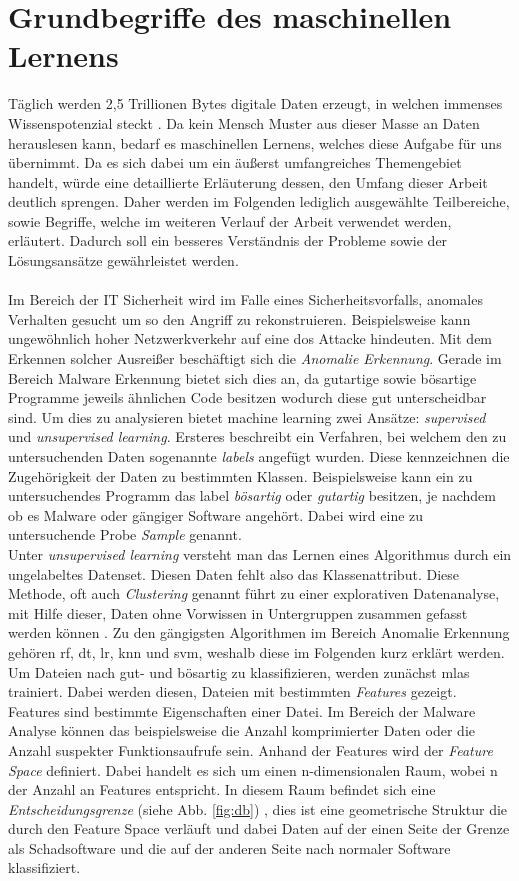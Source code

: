 \documentclass[
    12pt, %
    DIV10,
    ngerman, %
    a4paper, %
    oneside, %
    titlepage, %
    parskip=half, %
    headings=normal, %
    listof=totoc, %
    bibliography=totoc, %
    index=totoc, %
    captions=tableheading, %
    final %
]{scrreprt}
\begin{document}
\section{Grundbegriffe des maschinellen Lernens}
Täglich werden 2,5 Trillionen Bytes digitale Daten erzeugt, in welchen immenses Wissenspotenzial steckt \parencite{MerlinOne}. Da kein Mensch Muster aus dieser Masse an Daten herauslesen kann, bedarf es maschinellen Lernens, welches diese Aufgabe für uns übernimmt. Da es sich dabei um ein äu{\ss}erst umfangreiches Themengebiet handelt, würde eine detaillierte Erläuterung dessen, den Umfang dieser Arbeit deutlich sprengen. Daher werden im Folgenden lediglich ausgewählte Teilbereiche, sowie Begriffe, welche im weiteren Verlauf der Arbeit verwendet werden, erläutert. Dadurch soll ein besseres Verständnis der Probleme sowie der Lösungsansätze gewährleistet werden.\\\\
Im Bereich der IT Sicherheit wird im Falle eines Sicherheitsvorfalls, anomales Verhalten gesucht um so den Angriff zu rekonstruieren. Beispielsweise kann ungewöhnlich hoher Netzwerkverkehr auf eine \ac{dos} Attacke hindeuten. Mit dem Erkennen solcher Ausrei{\ss}er beschäftigt sich die \emph{Anomalie Erkennung}. Gerade im Bereich Malware Erkennung bietet sich dies an, da gutartige sowie bösartige Programme jeweils ähnlichen Code besitzen wodurch diese gut unterscheidbar sind. Um dies zu analysieren bietet machine learning zwei Ansätze: \emph{supervised} und \emph{unsupervised learning}. Ersteres beschreibt ein Verfahren, bei welchem den zu untersuchenden Daten sogenannte \emph{labels} angefügt wurden. Diese kennzeichnen die Zugehörigkeit der Daten zu bestimmten Klassen. Beispielsweise kann ein zu untersuchendes Programm das label \emph{bösartig} oder \emph{gutartig} besitzen, je nachdem ob es Malware oder gängiger Software angehört. Dabei wird eine zu untersuchende Probe \emph{Sample} genannt.\\
Unter \emph{unsupervised learning} versteht man das Lernen eines Algorithmus durch ein ungelabeltes Datenset. Diesen Daten fehlt also das Klassenattribut. Diese Methode, oft auch \emph{Clustering} genannt führt zu einer explorativen Datenanalyse, mit Hilfe dieser, Daten ohne Vorwissen in Untergruppen zusammen gefasst werden können \parencite{raschka2017python}.
Zu den gängigsten Algorithmen im Bereich Anomalie Erkennung gehören \ac{rf}, \ac{dt}, \ac{lr}, \ac{knn} und \ac{svm}, weshalb diese im Folgenden kurz erklärt werden.\\
Um Dateien nach gut- und bösartig zu klassifizieren, werden zunächst \ac{mlas} trainiert. Dabei werden diesen, Dateien mit bestimmten \emph{Features} gezeigt. Features sind bestimmte Eigenschaften einer Datei. Im Bereich der Malware Analyse können das beispielsweise die Anzahl komprimierter Daten oder die Anzahl suspekter Funktionsaufrufe sein. Anhand der Features wird der \emph{Feature Space} definiert. Dabei handelt es sich um einen n-dimensionalen Raum, wobei n der Anzahl an Features entspricht. In diesem Raum befindet sich eine \emph{Entscheidungsgrenze} (siehe Abb. \ref{fig:db}) , dies ist eine geometrische Struktur die durch den Feature Space verläuft und dabei Daten auf der einen Seite der Grenze als Schadsoftware und die auf der anderen Seite nach normaler Software klassifiziert.
\end{document}
